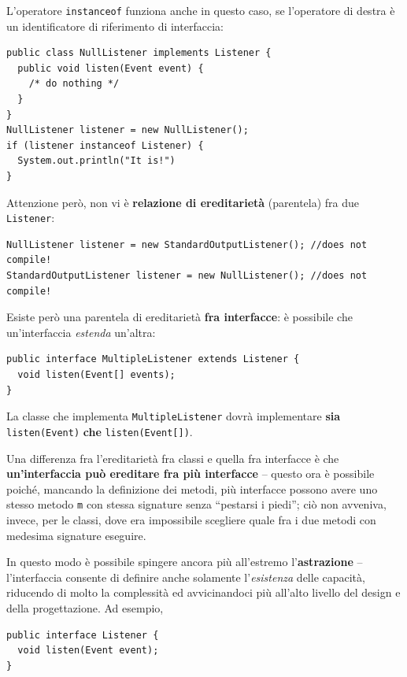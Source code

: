\documentclass[\fontsizeclass,twocolumn]{\classname}
\theoremstyle{definition}
\theoremstyle{definition}
\begin{document}
L'operatore \texttt{instanceof} funziona anche in questo caso, se l'operatore
di destra è un identificatore di riferimento di interfaccia:

\begin{lstlisting}
public class NullListener implements Listener {
  public void listen(Event event) {
    /* do nothing */
  }
}
NullListener listener = new NullListener();
if (listener instanceof Listener) {
  System.out.println("It is!")
}
\end{lstlisting}

Attenzione però, non vi è \textbf{relazione di ereditarietà} (parentela) fra
due \texttt{Listener}:

\begin{lstlisting}
NullListener listener = new StandardOutputListener(); //does not compile!
StandardOutputListener listener = new NullListener(); //does not compile!
\end{lstlisting}

Esiste però una parentela di ereditarietà \textbf{fra interfacce}: è possibile
che un'interfaccia \emph{estenda} un'altra:

\begin{lstlisting}
public interface MultipleListener extends Listener {
  void listen(Event[] events);
}
\end{lstlisting}

La classe che implementa \texttt{MultipleListener} dovrà implementare
\textbf{sia} \texttt{listen\-(Event)} \textbf{che} \texttt{listen\-(Event[])}.

Una differenza fra l'ereditarietà fra classi e quella fra interfacce è che
\textbf{un'interfaccia può ereditare fra più interfacce} -- questo ora è
possibile poiché, mancando la definizione dei metodi, più interfacce possono
avere uno stesso metodo \texttt{m} con stessa signature senza ``pestarsi i
piedi''; ciò non avveniva, invece, per le classi, dove era impossibile
scegliere quale fra i due metodi con medesima signature eseguire.

In questo modo è possibile spingere ancora più all'estremo
l'\textbf{astrazione} -- l'interfaccia consente di definire anche solamente
l'\emph{esistenza} delle capacità, riducendo di molto la complessità ed
avvicinandoci più all'alto livello del design e della progettazione. Ad
esempio,

\begin{lstlisting}
public interface Listener {
  void listen(Event event);
}
\end{lstlisting}
\end{document}
